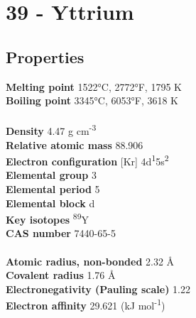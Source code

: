\section{39 - Yttrium}
\label{sec:elem-yttrium}
\subsection{Properties}
\textbf{Melting point} 1522°C, 2772°F, 1795 K\\
\textbf{Boiling point} 3345°C, 6053°F, 3618 K\\
\\
\textbf{Density} 4.47 g cm\textsuperscript{-3}\\
\textbf{Relative atomic mass} 88.906\\
\textbf{Electron configuration} [Kr] 4d\textsuperscript{1}5s\textsuperscript{2}\\
\textbf{Elemental group} 3\\
\textbf{Elemental period} 5\\
\textbf{Elemental block} d\\
\textbf{Key isotopes} \textsuperscript{89}Y\\
\textbf{CAS number} 7440-65-5\\
\\
\textbf{Atomic radius, non-bonded} 2.32 Å\\
\textbf{Covalent radius} 1.76 Å\\
\textbf{Electronegativity (Pauling scale)} 1.22\\
\textbf{Electron affinity} 29.621 (kJ mol\textsuperscript{-1})\\